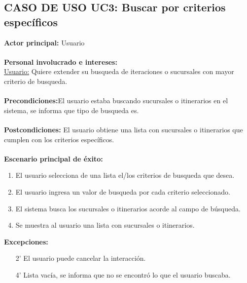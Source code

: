 \documentclass[12pt]{article}
\begin{document}
\subsection{\textbf{CASO DE USO UC3:} Buscar por criterios específicos }
\textbf{Actor principal:} Usuario\\
\\
\textbf{Personal involucrado e intereses: }\\\underline{Usuario:} Quiere extender su busqueda de iteraciones o sucursales con mayor criterio de busqueda.
\\\\
\textbf{Precondiciones:}El usuario estaba buscando sucursales o itinerarios en el sistema, se informa que tipo de busqueda es.\\ 
\\
\textbf{Postcondiciones:} El usuario obtiene una lista con sucursales o itinerarios que cumplen con los criterios específicos.\\
\\
\textbf{Escenario principal de éxito:}
\begin{enumerate}
\item El usuario selecciona de una lista el/los criterios de busqueda que desea.
\item El usuario ingresa un valor de busqueda por cada criterio seleccionado.
\item El sistema busca los sucursales o itinerarios acorde al campo de búsqueda.
\item Se muestra al usuario una lista con sucursales o itinerarios.
\end{enumerate}
\textbf{Excepciones:}
\begin{enumerate}
\item[2'] El usuario puede cancelar la interacción.
\item[4'] Lista vacía, se informa que no se encontró lo que el usuario buscaba.
\end{enumerate}
\newpage
\end{document}
